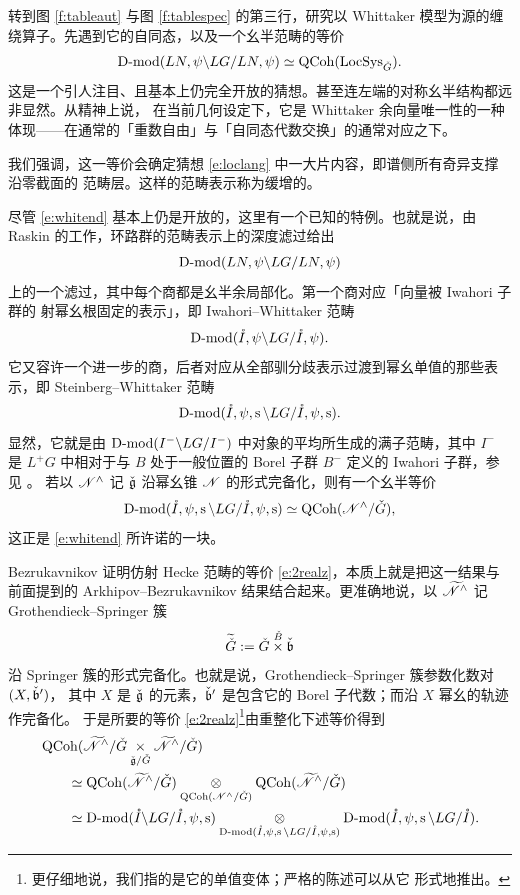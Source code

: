 \ssszh 转到图 \ref{f:tableaut} 与图 \ref{f:tablespec} 的第三行，研究以 Whittaker 模型为源的缠绕算子。先遇到它的自同态，以及一个幺半范畴的等价
%
\begin{equation} \label{e:whitend} \operatorname{D-mod}(LN, \psi \backslash LG / LN, \psi)
\simeq \operatorname{QCoh}(\operatorname{LocSys}_{\check{G}}).\end{equation}
%
这是一个引人注目、且基本上仍完全开放的猜想。甚至连左端的对称幺半结构都远非显然。从精神上说，
在当前几何设定下，它是 Whittaker 余向量唯一性的一种体现——在通常的「重数自由」与「自同态代数交换」的通常对应之下。

我们强调，这一等价会确定猜想 \eqref{e:loclang} 中一大片内容，即谱侧所有奇异支撑沿零截面的
范畴层。这样的范畴表示称为缓增的。

\begin{re} 尽管 \eqref{e:whitend} 基本上仍是开放的，这里有一个已知的特例。也就是说，由 Raskin \cite{whit}
的工作，环路群的范畴表示上的深度滤过给出
\[
\operatorname{D-mod}(LN, \psi \backslash LG / LN, \psi)
\]
上的一个滤过，其中每个商都是幺半余局部化。第一个商对应「向量被 Iwahori 子群的
射幂幺根固定的表示」，即 Iwahori--Whittaker 范畴
%
\[
     \operatorname{D-mod}(\mathring{I}, \psi \backslash LG / \mathring{I}, \psi).
\]
%
它又容许一个进一步的商，后者对应从全部驯分歧表示过渡到幂幺单值的那些表示，即
Steinberg--Whittaker 范畴
%
\[
   \operatorname{D-mod}(\mathring{I}, \psi, \operatorname{s} \backslash LG / \mathring{I}, \psi,
   \operatorname{s}).
\]
%
显然，它就是由 $\operatorname{D-mod}(I^- \backslash LG / I^-)$ 中对象的平均所生成的满子范畴，其中 $I^-$ 是
$L^+G$ 中相对于与 $B$ 处于一般位置的 Borel 子群 $B^-$ 定义的 Iwahori 子群，参见 \cite{ahc}。
若以 $\mathscr{N}^{\wedge}$ 记 $\check{\mathfrak{g}}$ 沿幂幺锥 $\mathscr{N}$ 的形式完备化，则有一个幺半等价
%
\[
    \operatorname{D-mod}(\mathring{I}, \psi, \operatorname{s} \backslash LG / \mathring{I}, \psi,
    \operatorname{s}) \simeq \operatorname{QCoh}( \mathscr{N}^\wedge / \check{G}),
\]
%
这正是 \eqref{e:whitend} 所许诺的一块。

Bezrukavnikov 证明仿射 Hecke 范畴的等价 \eqref{e:2realz}，本质上就是把这一结果与前面提到的
Arkhipov--Bezrukavnikov 结果结合起来。更准确地说，以 $\widetilde{\mathscr{N}}^\wedge$ 记
Grothendieck--Springer 簇
\[
\widetilde{\check{G}} := \check{G} \overset {\check{B}} \times \check{\mathfrak{b}}
\]
沿 Springer 簇的形式完备化。也就是说，Grothendieck--Springer 簇参数化数对 $(X, \check{\mathfrak{b}}')$，
其中 $X$ 是 $\check{\mathfrak{g}}$ 的元素，$\check{\mathfrak{b}}'$ 是包含它的 Borel 子代数；而沿 $X$ 幂幺的轨迹作完备化。
于是所要的等价 \eqref{e:2realz}\footnote{更仔细地说，我们指的是它的单值变体；严格的陈述可以从它
形式地推出。}由重整化下述等价得到
%
{\small
\begin{align*} &\operatorname{QCoh}( \widetilde{\mathscr{N}}^\wedge / \check{G}  \underset {\check{\mathfrak{g}} / \check{G}}
\times
\widetilde{\mathscr{N}}^\wedge / \check{G}) \\
&\qquad \simeq \operatorname{QCoh}(\widetilde{\mathscr{N}}^\wedge / \check{G})  \underset {\operatorname{QCoh}(\mathscr{N}^\wedge / \check{G})}
\otimes  \operatorname{QCoh}(\widetilde{\mathscr{N}}^\wedge / \check{G} ) \\ &\qquad \simeq \operatorname{D-mod}(\mathring{I}
\backslash LG / \mathring{I}, \psi, \operatorname{s}) \underset {\operatorname{D-mod}(\mathring{I},
\psi, \operatorname{s} \backslash LG / \mathring{I}, \psi, \operatorname{s})} \otimes
\operatorname{D-mod}(\mathring{I}, \psi, \operatorname{s} \backslash LG / \mathring{I}).  \end{align*}}
%

\end{re}

